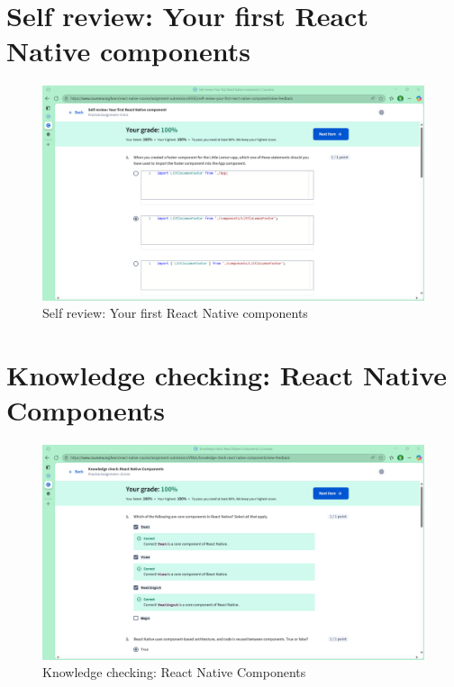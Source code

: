 \section{Self review: Your first React Native components}
\begin{figure}[H]
    \centering
    \includegraphics[width=0.5\linewidth]{images/self-review-1.pdf}
    \caption{Self review: Your first React Native components}
    \label{fig:placeholder}
\end{figure}

\section{Knowledge checking: React Native Components}
\begin{figure}[H]
    \centering
    \includegraphics[width=0.5\linewidth]{images/knowledge-checking-2.pdf}
    \caption{Knowledge checking: React Native Components}
    \label{fig:placeholder}
\end{figure}